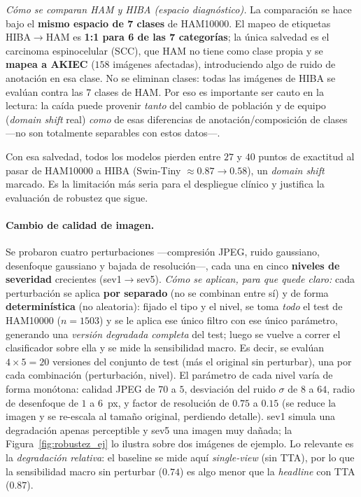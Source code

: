 \documentclass[11pt, a4paper]{article}
\begin{document}
\emph{Cómo se comparan HAM y HIBA (espacio diagnóstico).} La comparación se hace bajo el \textbf{mismo
espacio de 7 clases} de HAM10000. El mapeo de etiquetas HIBA$\to$HAM es \textbf{1:1 para 6 de las 7
categorías}; la única salvedad es el carcinoma espinocelular (SCC), que HAM no tiene como clase propia y se
\textbf{mapea a AKIEC} ($158$ imágenes afectadas), introduciendo algo de ruido de anotación en esa clase.
No se eliminan clases: todas las imágenes de HIBA se evalúan contra las 7 clases de HAM. Por eso es
importante ser cauto en la lectura: la caída puede provenir \emph{tanto} del cambio de población y de
equipo (\emph{domain shift} real) \emph{como} de esas diferencias de anotación/composición de clases —no
son totalmente separables con estos datos—.

Con esa salvedad, todos los modelos pierden entre $27$ y $40$ puntos de exactitud al pasar de HAM10000 a
HIBA (Swin-Tiny $\approx 0.87 \to 0.58$), un \emph{domain shift} marcado. Es la limitación más seria para
el despliegue clínico y justifica la evaluación de robustez que sigue.

\paragraph{Cambio de calidad de imagen.}
Se probaron cuatro perturbaciones —compresión JPEG, ruido gaussiano, desenfoque gaussiano y bajada de
resolución—, cada una en cinco \textbf{niveles de severidad} crecientes (sev1$\to$sev5). \emph{Cómo se
aplican, para que quede claro:} cada perturbación se aplica \textbf{por separado} (no se combinan entre
sí) y de forma \textbf{determinística} (no aleatoria): fijado el tipo y el nivel, se toma \emph{todo} el
test de HAM10000 ($n=1503$) y se le aplica ese único filtro con ese único parámetro, generando una
\emph{versión degradada completa} del test; luego se vuelve a correr el clasificador sobre ella y se mide
la sensibilidad macro. Es decir, se evalúan $4 \times 5 = 20$ versiones del conjunto de test (más el
original sin perturbar), una por cada combinación (perturbación, nivel). El parámetro de cada nivel varía
de forma monótona: calidad JPEG de $70$ a $5$, desviación del ruido $\sigma$ de $8$ a $64$, radio de
desenfoque de $1$ a $6$~px, y factor de resolución de $0.75$ a $0.15$ (se reduce la imagen y se re-escala
al tamaño original, perdiendo detalle). sev1 simula una degradación apenas perceptible y sev5 una imagen
muy dañada; la Figura~\ref{fig:robustez_ej} lo ilustra sobre dos imágenes de ejemplo. Lo relevante es la
\emph{degradación relativa}: el baseline se mide aquí \emph{single-view} (sin TTA), por lo que la
sensibilidad macro sin perturbar ($0.74$) es algo menor que la \emph{headline} con TTA ($0.87$).
\end{document}
